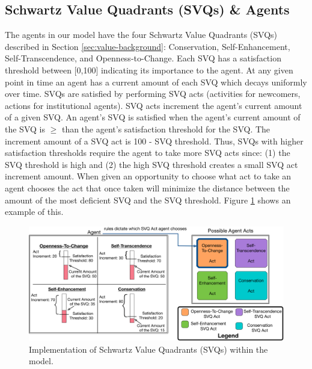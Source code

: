 \documentclass{scspaperproc}
\theoremstyle{scsthe}
\begin{document}
\subsection{Schwartz Value Quadrants (SVQs) \& Agents} 
The agents in our model have the four Schwartz Value Quadrants (SVQs) described in Section \ref{sec:value-background}: Conservation, Self-Enhancement, Self-Transcendence, and Openness-to-Change. Each SVQ has a satisfaction threshold between [0,100] indicating its importance to the agent. At any given point in time an agent has a current amount of each SVQ which decays uniformly over time. SVQs are satisfied by performing SVQ acts (activities for newcomers, actions for institutional agents). SVQ acts increment the agent's current amount of a given SVQ. An agent's SVQ is satisfied when the agent's current amount of the SVQ is $\geq$ than the agent's satisfaction threshold for the SVQ. The increment amount of a SVQ act is 100 - SVQ threshold. Thus, SVQs with higher satisfaction thresholds require the agent to take more SVQ acts since: (1) the SVQ threshold is high and (2) the high SVQ threshold creates a small SVQ act increment amount. When given an opportunity to choose what act to take an agent chooses the act that once taken will minimize the distance between the amount of the most deficient SVQ and the SVQ threshold. Figure \ref{fig:agent-val} shows an example of this.

\begin{figure}[htb]
{
\centering
\includegraphics[width=0.75\columnwidth]{Agent-Value-In-Model.png}
\caption{Implementation of Schwartz Value Quadrants (SVQs) within the model.}
\label{fig:agent-val}
}
\end{figure}
\end{document}
